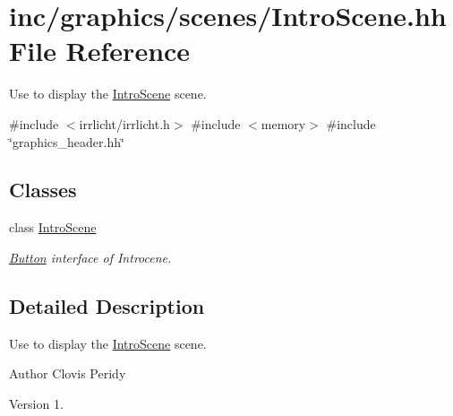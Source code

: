 \hypertarget{IntroScene_8hh}{}\section{inc/graphics/scenes/\+Intro\+Scene.hh File Reference}
\label{IntroScene_8hh}


Use to display the \hyperlink{classIntroScene}{Intro\+Scene} scene.  


{\ttfamily \#include $<$irrlicht/irrlicht.\+h$>$}\newline
{\ttfamily \#include $<$memory$>$}\newline
{\ttfamily \#include \char`\"{}graphics\+\_\+header.\+hh\char`\"{}}\newline
\subsection*{Classes}
\begin{DoxyCompactItemize}
\item 
class \hyperlink{classIntroScene}{Intro\+Scene}
\begin{DoxyCompactList}\small\item\em \hyperlink{classButton}{Button} interface of Introcene. \end{DoxyCompactList}\end{DoxyCompactItemize}


\subsection{Detailed Description}
Use to display the \hyperlink{classIntroScene}{Intro\+Scene} scene. 

\begin{DoxyAuthor}{Author}
Clovis Peridy 
\end{DoxyAuthor}
\begin{DoxyVersion}{Version}
1. 
\end{DoxyVersion}
